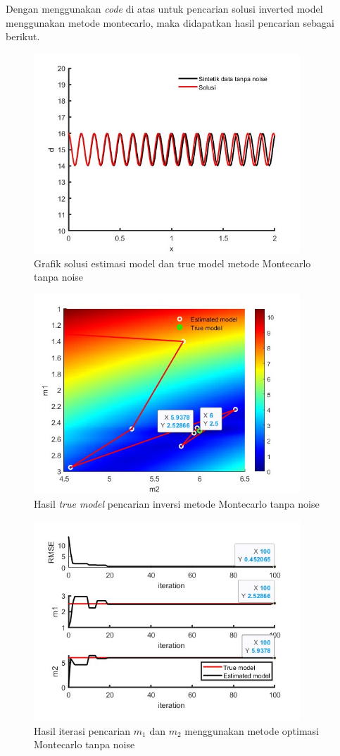 \documentclass{article}
\begin{document}
Dengan menggunakan \textit{code} di atas untuk pencarian solusi inverted model menggunakan metode montecarlo, maka didapatkan hasil pencarian sebagai berikut.
\begin{figure}[h]
    \centering
    \includegraphics[width=10cm]{figure/mc true solution no noise.jpg}
    \caption{Grafik solusi estimasi model dan true model metode Montecarlo tanpa noise}
    \label{fig:mc true sol}
\end{figure}
\begin{figure}[h]
    \centering
    \includegraphics[width=10cm]{figure/mc true model no noise.jpg}
    \caption{Hasil \textit{true model} pencarian inversi metode Montecarlo tanpa noise}
    \label{fig:mc true model}
\end{figure}
\begin{figure}[h]
    \centering
    \includegraphics[width=10cm]{figure/mc rmse iterasi no noise.jpg}
    \caption{Hasil iterasi pencarian $m_1$ dan $m_2$ menggunakan metode optimasi Montecarlo tanpa noise}
    \label{fig:mc iterasi}
\end{figure}
\end{document}
